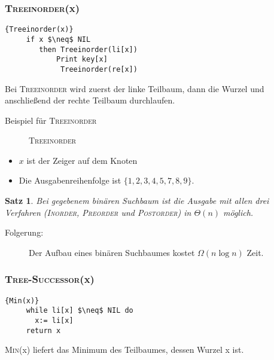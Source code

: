 \documentclass[ngerman,draft,parskip=half*,twoside]{scrreprt}
\theoremstyle{break}
\newtheorem{satz}{Satz}[chapter]
\theoremstyle{nonumberbreak}
\begin{document}
 \subsubsection{\textsc{Treeinorder}(x)}
   \begin{Algorithmus}[H]	
\begin{lstlisting}[frame=tlrb, mathescape=true, title=\textsc{Treeinorder\textnormal{(x)}}, gobble=4]{Treeinorder(x)}
     if x $\neq$ NIL
        then Treeinorder(li[x])
        	Print key[x]
             Treeinorder(re[x])
\end{lstlisting}

    Bei \textsc{Treeinorder} wird zuerst der linke Teilbaum, dann die 
    Wurzel und anschließend der rechte Teilbaum durchlaufen.
\end{Algorithmus}

  Beispiel für \textsc{Treeinorder}
  \begin{figure}[H]
  \centering  
   \caption{\textsc{Treeinorder}}
   \label{171103d}
  \end{figure}
 \begin{itemize}
  \item $x$ ist der Zeiger auf dem Knoten
  \item Die Ausgabenreihenfolge ist $\{1,2,3,4,5,7,8,9\}$.
 \end{itemize}
 
  \begin{satz}
 Bei gegebenem binären Suchbaum ist die Ausgabe mit allen drei Verfahren (\textsc{Inorder}, 
 \textsc{Preorder} und \textsc{Postorder}) in $\Theta( n )$ möglich.
 \end{satz}
 \begin{description}
  \item[Folgerung:] Der Aufbau eines binären Suchbaumes kostet $\Omega( n \log n )$ Zeit.
 \end{description}
 
 \subsubsection{\textsc{Tree-Successor}(x)}
 
   \begin{Algorithmus}[H]
    \begin{lstlisting}[frame=tlrb, mathescape=true, title=\textsc{Min\textnormal{(x)}}, gobble=4]{Min(x)}
     while li[x] $\neq$ NIL do
       x:= li[x]
     return x
    \end{lstlisting}

   \textsc{Min}(x) liefert das Minimum des Teilbaumes, dessen Wurzel x ist.
   \end{Algorithmus}
   
\end{document}
